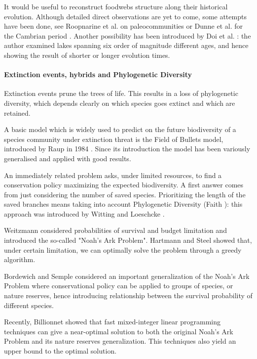 \documentclass[12pt,a4paper]{report}
\begin{document}
It would be useful to reconstruct foodwebs structure along their historical evolution. Although detailed direct observations are yet to come, some attempts have been done, see Roopnarine et al. on paleocommunities \cite{roopnarine_networks_2010, roopnarine_red_2012} or Dunne et al. for the Cambrian period \cite{dunne_compilation_2008}. Another possibility has been introduced by Doi et al. \cite{doi_shorter_2012}: the author examined lakes spanning six order of magnitude different ages, and hence showing the result of shorter or longer evolution times.

\paragraph{Extinction events, hybrids and Phylogenetic Diversity}
Extinction events prune the trees of life. This results in a loss of phylogenetic diversity, which depends clearly on which species goes extinct and which are retained.

A basic model which is widely used to predict on the future biodiversity of a species community under extinction threat is the Field of Bullets model, introduced by Raup in 1984 \cite{raup1984evolutionary}. Since its introduction the model has been variously generalised and applied with good results.

An immediately related problem asks, under limited resources, to find a conservation policy maximizing the expected biodiversity. A first answer comes from just considering the number of saved species. Prioritizing the length of the saved branches means taking into account Phylogenetic Diversity (Faith \cite{faith1992conservation}): this approach was introduced by Witting and Loeschcke \cite{witting1995optimization}.

Weitzmann \cite{weitzman1998noah} considered probabilities of survival and budget limitation and introduced the so-called "Noah's Ark Problem". Hartmann and Steel \cite{hartmann2006maximizing} showed that, under certain limitation, we can optimally solve the problem through a greedy algorithm.

Bordewich and Semple \cite{bordewich2008nature} considered an important generalization of the Noah's Ark Problem where conservational policy can be applied to groups of species, or nature reserves, hence introducing relationship between the survival probability of different species.

Recently, Billionnet \cite{Billionnet01012013} showed that fast mixed-integer linear programming techniques can give a near-optimal solution to both the original Noah's Ark Problem and its nature reserves generalization. This techniques also yield an upper bound to the optimal solution.
\end{document}
